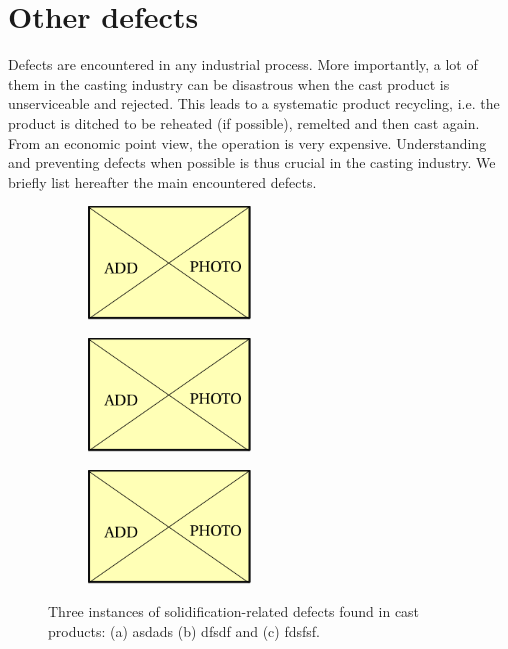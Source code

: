 \section{Other defects}
%
Defects are encountered in any industrial process. More importantly, 
a lot of them in the casting industry can be disastrous when the cast product is unserviceable and rejected. 
This leads to a systematic product recycling, i.e. the product is ditched to be reheated (if possible), remelted 
and then cast again. From an economic point view, the operation is very expensive. Understanding and preventing defects when possible is thus crucial in 
the casting industry. We briefly list hereafter the main encountered defects.
%
\begin{figure}[htbp]
\centering
  \begin{subfigure}[t]{0.3\textwidth}
    \centering
	\includegraphics[height=3cm]{Misc/dummy.pdf}
	\caption{}
    \label{fig:hot tearing}
  \end{subfigure}
   \begin{subfigure}[t]{0.3\textwidth}
    \centering
	\includegraphics[height=3cm]{Misc/dummy.pdf}
	\caption{}
    \label{fig:porosity}
  \end{subfigure}
   \begin{subfigure}[t]{0.3\textwidth}
    \centering
	\includegraphics[height=3cm]{Misc/dummy.pdf}
	\caption{}
    \label{fig:freckle}
  \end{subfigure}
\caption{Three instances of solidification-related defects found in cast products: (a) asdads (b) dfsdf and (c) fdsfsf. }
\label{fig:casting}
\end{figure}
%
%

